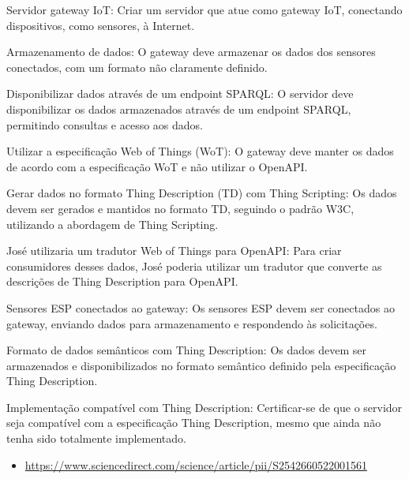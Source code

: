 Servidor gateway IoT: Criar um servidor que atue como gateway IoT, conectando dispositivos, como sensores, à Internet.

Armazenamento de dados: O gateway deve armazenar os dados dos sensores conectados, com um formato não claramente definido.

Disponibilizar dados através de um endpoint SPARQL: O servidor deve disponibilizar os dados armazenados através de um endpoint SPARQL, permitindo consultas e acesso aos dados.

Utilizar a especificação Web of Things (WoT): O gateway deve manter os dados de acordo com a especificação WoT e não utilizar o OpenAPI.

Gerar dados no formato Thing Description (TD) com Thing Scripting: Os dados devem ser gerados e mantidos no formato TD, seguindo o padrão W3C, utilizando a abordagem de Thing Scripting.

José utilizaria um tradutor Web of Things para OpenAPI: Para criar consumidores desses dados, José poderia utilizar um tradutor que converte as descrições de Thing Description para OpenAPI.

Sensores ESP conectados ao gateway: Os sensores ESP devem ser conectados ao gateway, enviando dados para armazenamento e respondendo às solicitações.

Formato de dados semânticos com Thing Description: Os dados devem ser armazenados e disponibilizados no formato semântico definido pela especificação Thing Description.

Implementação compatível com Thing Description: Certificar-se de que o servidor seja compatível com a especificação Thing Description, mesmo que ainda não tenha sido totalmente implementado.

\begin{itemize}
    \item \url{https://www.sciencedirect.com/science/article/pii/S2542660522001561}
\end{itemize}
